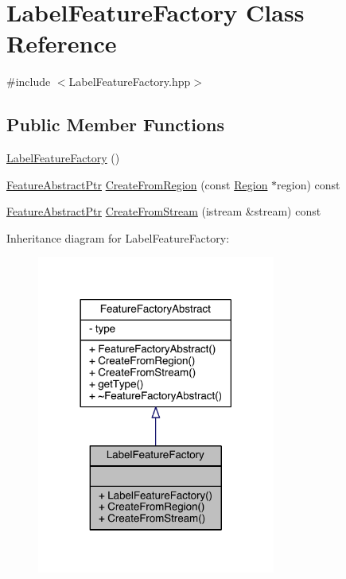 \hypertarget{class_label_feature_factory}{\section{Label\+Feature\+Factory Class Reference}
\label{class_label_feature_factory}
}


{\ttfamily \#include $<$Label\+Feature\+Factory.\+hpp$>$}

\subsection*{Public Member Functions}
\begin{DoxyCompactItemize}
\item 
\hyperlink{class_label_feature_factory_ab7fc88ba9a535add8497ca772786ee7b}{Label\+Feature\+Factory} ()
\item 
\hyperlink{class_feature_abstract_ptr}{Feature\+Abstract\+Ptr} \hyperlink{class_label_feature_factory_af0032431002f8af5c9ddd3d4a20dff6a}{Create\+From\+Region} (const \hyperlink{class_region}{Region} $\ast$region) const 
\item 
\hyperlink{class_feature_abstract_ptr}{Feature\+Abstract\+Ptr} \hyperlink{class_label_feature_factory_a1308774f27afba555af8162e7e6d33ad}{Create\+From\+Stream} (istream \&stream) const 
\end{DoxyCompactItemize}


Inheritance diagram for Label\+Feature\+Factory\+:\nopagebreak
\begin{figure}[H]
\begin{center}
\leavevmode
\includegraphics[width=222pt]{class_label_feature_factory__inherit__graph}
\end{center}
\end{figure}


